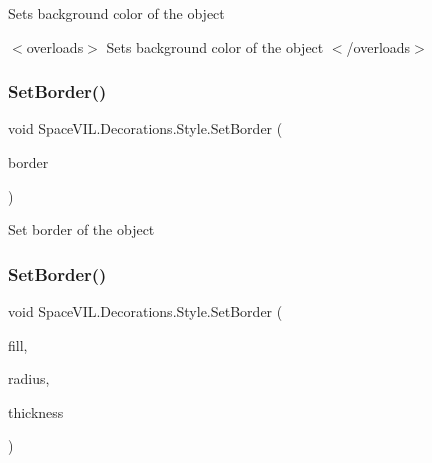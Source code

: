 Sets background color of the object 

$<$overloads$>$ Sets background color of the object $<$/overloads$>$ \mbox{\label{class_space_v_i_l_1_1_decorations_1_1_style_a817065fca5e9d8a90859ac6998eb2b33}} 
\subsubsection{\texorpdfstring{Set\+Border()}{SetBorder()}\hspace{0.1cm}{\footnotesize\ttfamily [1/2]}}
{\footnotesize\ttfamily void Space\+V\+I\+L.\+Decorations.\+Style.\+Set\+Border (\begin{DoxyParamCaption}\item[{\mbox{\hyperlink{class_space_v_i_l_1_1_decorations_1_1_border}{Border}}}]{border }\end{DoxyParamCaption})\hspace{0.3cm}{\ttfamily [inline]}}



Set border of the object 

\mbox{\label{class_space_v_i_l_1_1_decorations_1_1_style_a34049d6afa31bb37c08b495a0b6d0dba}} 
\subsubsection{\texorpdfstring{Set\+Border()}{SetBorder()}\hspace{0.1cm}{\footnotesize\ttfamily [2/2]}}
{\footnotesize\ttfamily void Space\+V\+I\+L.\+Decorations.\+Style.\+Set\+Border (\begin{DoxyParamCaption}\item[{Color}]{fill,  }\item[{\mbox{\hyperlink{class_space_v_i_l_1_1_decorations_1_1_corner_radius}{Corner\+Radius}}}]{radius,  }\item[{int}]{thickness }\end{DoxyParamCaption})\hspace{0.3cm}{\ttfamily [inline]}}



